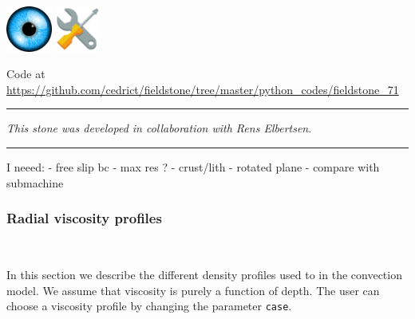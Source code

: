 \includegraphics[height=1.5cm]{images/pictograms/visualisation}
\includegraphics[height=1.5cm]{images/pictograms/tools}



\begin{center}
Code at \url{https://github.com/cedrict/fieldstone/tree/master/python_codes/fieldstone_71}
\end{center}

\par\noindent\rule{\textwidth}{0.4pt}

{\sl This stone was developed in collaboration with Rens Elbertsen}. 

\par\noindent\rule{\textwidth}{0.4pt}

I neeed:
- free slip bc
- max res ?
- crust/lith
- rotated plane 
- compare with submachine


\subsubsection*{Radial viscosity profiles}

\

In this section we describe the different density profiles used to in the convection model. We assume that viscosity is purely a function of depth. The user can choose a viscosity profile by changing the parameter \texttt{case}.

